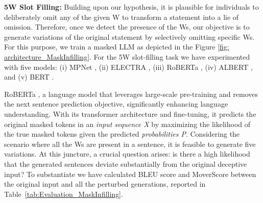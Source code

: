 \begin{comment}
After the mapping is done, a detailed analysis for the presence of each of the 5W is conducted which is summarized in figure \ref{fig: 5W_presence}.




We have leveraged 4 masking LLMs, (bert-base-uncased \cite{}, roberta \cite{}, XLNet \cite{} and ELECTRA \cite{}) to mask and replace the 5Ws generated by the AllenNLP model for the paraphrased sentences.

We have used “fill-mask” to get the output. Fill-mask is a technique within the Hugging Face Transformers Library that allows masked language modeling tasks. It is used in some NLP models to predict missing words in a sentence. In this approach, the model is given a sentence with one or more masked words, represented by special tokens such as "[MASK]", and the goal is to predict the most likely word(s) to fill in the blanks.

The top three generations from each of these models were considered for final data augmentation. The selection of the top three words was based on a metric called x.
\end{comment}

\noindent
\textbf{5W Slot Filling:} Building upon our hypothesis, it is plausible for individuals to deliberately omit any of the given W to transform a statement into a lie of omission. Therefore, once we detect the presence of the Ws, our objective is to generate variations of the original statement by selectively omitting specific Ws. For this purpose, we train a masked LLM as depicted in the Figure \ref{fig: architecture_MaskInfilling}. For the 5W slot-filling task we have experimented with five models: (i) MPNet \cite{song2020mpnet}
, (ii) ELECTRA \cite{clark2020electra},
(iii) RoBERTa \cite{liu2019roberta}, (iv) ALBERT \cite{lan2019albert}, and (v) BERT \cite{devlin2018bert}.

RoBERTa \cite{liu2019roberta}, a language model that leverages large-scale pre-training and removes the next sentence prediction objective, significantly enhancing language understanding. With its transformer architecture and fine-tuning, it predicts the original masked tokens in an \textit{input sequence X} by maximizing the likelihood of the true masked tokens given the predicted \textit{probabilities P}. Considering the scenario where all the Ws are present in a sentence, it is feasible to generate five variations. At this juncture, a crucial question arises: is there a high likelihood that the generated sentences deviate substantially from the original deceptive input? To substantiate we have calculated BLEU \cite{papineni2002bleu} score and MoverScore \cite{zhao-etal-2019-moverscore} between the original input and all the perturbed generations, reported in Table~\ref{tab:Evaluation_MaskInfilling}. 










